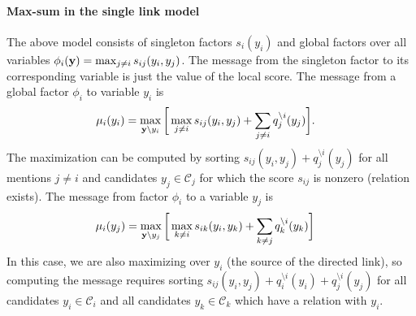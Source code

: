 \paragraph{Max-sum in the single link model}
The above model consists of singleton factors $s_i(y_i)$ and global factors over all variables $\phi_i({\bf y}) = \max_{j \neq i} s_{ij}(y_i, y_j)$.  The message from the singleton factor to its corresponding variable is just the value of the local score. The message from a global factor $\phi_i$ to variable $y_i$ is
\begin{align}
\mu_i(y_i) &= \max_{{\bf y} \setminus y_i} \bigg[ \max_{j \neq i} s_{ij}(y_i, y_j) + \sum_{j \neq i} q_j^{\setminus i}(y_j)\bigg].
\end{align}
The maximization can be computed by sorting $s_{ij}(y_i, y_j) + q_j^{\setminus i}(y_j)$ for all mentions $j \neq i$ and candidates $y_j \in \mathcal{C}_j$ for which the score $s_{ij}$ is nonzero (relation exists). The message from factor $\phi_i$ to a variable $y_j$ is
\begin{align}
\mu_i(y_j) &= \max_{{\bf y} \setminus y_j} \bigg[ \max_{k \neq i} s_{ik}(y_i, y_k) + \sum_{k \neq j} q_k^{\setminus i}(y_k) \bigg]
\end{align}
In this case, we are also maximizing over $y_i$ (the source of the directed link), so computing the message requires sorting $s_{ij}(y_i, y_j) + q_i^{\setminus i}(y_i) + q_j^{\setminus i}(y_j)$ for all candidates $y_i \in \mathcal{C}_i$ and all candidates $y_k \in \mathcal{C}_k$ which have a relation with $y_i$.

